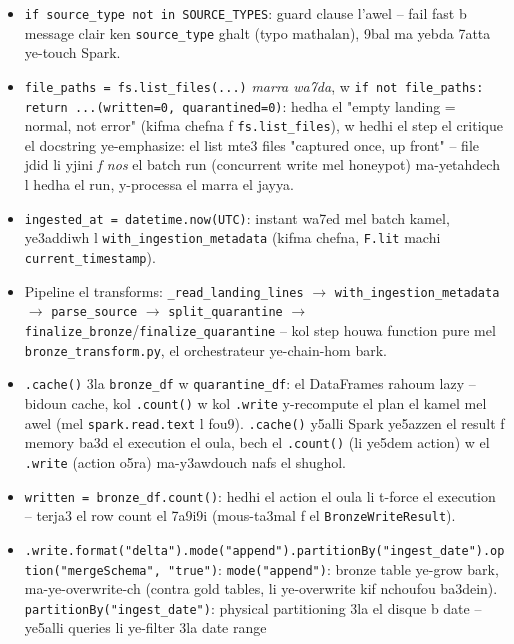 \documentclass[11pt,a4paper]{report}
\DeclareRobustCommand{\code}[1]{\texttt{#1}}
\begin{document}
\begin{itemize}
  \item \code{if source\_type not in SOURCE\_TYPES}: guard clause l'awel --
        fail fast b message clair ken \code{source\_type} ghalt (typo
        mathalan), 9bal ma yebda 7atta ye-touch Spark.
  \item \code{file\_paths = fs.list\_files(...)} \emph{marra wa7da}, w
        \code{if not file\_paths: return ...(written=0, quarantined=0)}:
        hedha el "empty landing = normal, not error" (kifma chefna
        f \code{fs.list\_files}), w hedhi el step el critique el
        docstring ye-emphasize: el list mte3 files "captured once, up
        front" -- file jdid li yjini \emph{f nos} el batch run (concurrent
        write mel honeypot) ma-yetahdech l hedha el run, y-processa el
        marra el jayya.
  \item \code{ingested\_at = datetime.now(UTC)}: instant wa7ed mel batch
        kamel, ye3addiwh l \code{with\_ingestion\_metadata} (kifma chefna,
        \code{F.lit} machi \code{current\_timestamp}).
  \item Pipeline el transforms: \code{\_read\_landing\_lines} $\to$
        \code{with\_ingestion\_metadata} $\to$ \code{parse\_source} $\to$
        \code{split\_quarantine} $\to$ \code{finalize\_bronze}/\code{finalize\_quarantine}
        -- kol step houwa function pure mel \code{bronze\_transform.py},
        el orchestrateur ye-chain-hom bark.
  \item \code{.cache()} 3la \code{bronze\_df} w \code{quarantine\_df}:
        el DataFrames rahoum lazy -- bidoun cache, kol \code{.count()}
        w kol \code{.write} y-recompute el plan el kamel mel awel
        (mel \code{spark.read.text} l fou9). \code{.cache()} y5alli
        Spark ye5azzen el result f memory ba3d el execution el oula,
        bech el \code{.count()} (li ye5dem action) w el \code{.write}
        (action o5ra) ma-y3awdouch nafs el shughol.
  \item \code{written = bronze\_df.count()}: hedhi el action el oula li
        t-force el execution -- terja3 el row count el 7a9i9i (mous-ta3mal
        f el \code{BronzeWriteResult}).
  \item \code{.write.format("delta").mode("append").partitionBy("ingest\_date").option("mergeSchema", "true")}:
        \code{mode("append")}: bronze table ye-grow bark, ma-ye-overwrite-ch
        (contra gold tables, li ye-overwrite kif nchoufou ba3dein).
        \code{partitionBy("ingest\_date")}: physical partitioning 3la
        el disque b date -- ye5alli queries li ye-filter 3la date range

\end{itemize}
\end{document}
